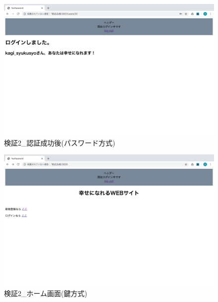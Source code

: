     \vspace{4cm}%
    \begin{figure}[H]
        \includegraphics[width=15cm]{./fig/chapter4/inspect_2/password_screnn/success.png}
        \caption{検証2\_認証成功後(パスワード方式)}
        \label{検証２認証成功後(パスワード方式)}
    \end{figure}

    \vspace{4cm}%
    \begin{figure}[H]
        \includegraphics[width=15cm]{./fig/chapter4/inspect_2/key_screnn/home.png}
        \caption{検証2\_ホーム画面(鍵方式)}
        \label{検証２ホーム画面(鍵方式)}
    \end{figure}

